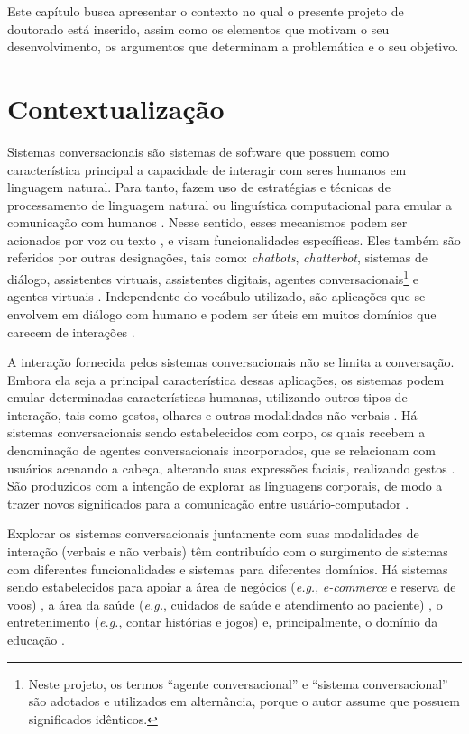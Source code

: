 \noindent Este capítulo busca apresentar o contexto no qual o presente projeto de doutorado está inserido, assim como os elementos que motivam o seu desenvolvimento, os argumentos que determinam a problemática e o seu objetivo.

\section{Contextualização}

Sistemas conversacionais são sistemas de software que possuem como característica principal a capacidade de interagir com seres humanos em linguagem natural. Para tanto, fazem uso de estratégias e técnicas de processamento de linguagem natural ou linguística computacional para emular a comunicação com humanos \cite{Tegos:2019}. Nesse sentido, esses mecanismos podem ser acionados por voz ou texto \cite{Dale:2016}, e visam funcionalidades específicas. Eles também são referidos por outras designações, tais como: \textit{chatbots}, \textit{chatterbot}, sistemas de diálogo, assistentes virtuais, assistentes digitais, agentes conversacionais\footnote{Neste projeto, os termos ``agente conversacional'' e ``sistema conversacional'' são adotados e utilizados em alternância, porque o autor assume que possuem significados idênticos.} e agentes virtuais \cite{Paschoal:2020FIE}.  Independente do vocábulo utilizado, são aplicações que se envolvem em diálogo com humano e podem ser úteis em muitos domínios que carecem de interações \cite{Montenegro:2019}. 

A interação fornecida pelos sistemas conversacionais não se limita a conversação. Embora ela seja a principal característica dessas aplicações, os sistemas podem emular determinadas características humanas, utilizando outros tipos de interação, tais como gestos, olhares e outras modalidades não verbais \cite{Montenegro:2019}.  Há sistemas conversacionais sendo estabelecidos com corpo, os quais recebem a denominação de agentes conversacionais incorporados, que se relacionam com usuários acenando a cabeça, alterando suas expressões faciais, realizando gestos \cite{cassell2000}. São produzidos com a intenção de explorar as linguagens corporais, de modo a trazer novos significados para a comunicação entre usuário-computador \cite{cassell2000}.

Explorar os sistemas conversacionais juntamente com suas modalidades de interação (verbais e não verbais) têm contribuído com o surgimento de sistemas com diferentes funcionalidades e sistemas para diferentes domínios. Há sistemas sendo estabelecidos para apoiar a área de negócios (\textit{e.g.}, \textit{e-commerce} e reserva de voos) \cite{Bavaresco:2020}, a área da saúde (\textit{e.g.}, cuidados de saúde e atendimento ao paciente) \cite{Car:2020,Montenegro:2019,Laranjo:2018}, o entretenimento (\textit{e.g.}, contar histórias e jogos) \cite{Sciuto:2018, Macias:2012} e, principalmente, o domínio da educação \cite{Paschoal:2020FIE, Winkler:2020}.

